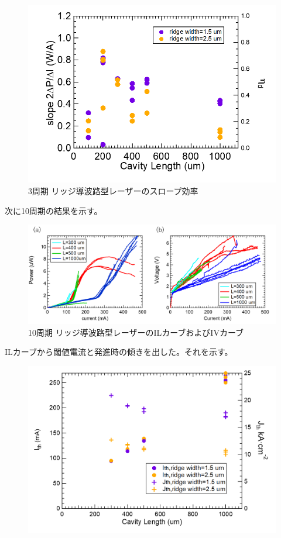 {\begin{figure}[h]
	\centering
	\includegraphics[width=15cm]{figure/fig_3_2_3QW_ridge_slope.png}
		\caption{3周期 リッジ導波路型レーザーのスロープ効率}
		\label{fig:fig_3_2_3QW_ridge_slope}
\end{figure}
\clearpage
次に10周期の結果を示す。
\begin{figure}[h]
	\centering
	\includegraphics[width=15cm]{figure/fig_3_2_10QW_ridge_IL.png}
		\caption{10周期 リッジ導波路型レーザーのILカーブおよびIVカーブ}
		\label{fig:fig_3_2_10QW_ridge_IL}
\end{figure}
ILカーブから閾値電流と発進時の傾きを出した。それを示す。
\begin{figure}[h]
	\centering
	\includegraphics[width=15cm]{figure/fig_3_2_10QW_ridge_Ith.png}

\end{figure}}
